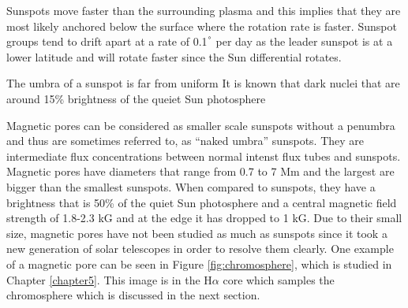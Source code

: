	Sunspots move faster than the surrounding plasma and this implies that they are most likely anchored below the surface where the rotation rate is faster.
	Sunspot groups tend to drift apart at a rate of 0.1$^\degree$ per day as the leader sunspot is at a lower latitude and will rotate faster since the Sun differential rotates.
	
	The umbra of a sunspot is far from uniform 
	It is known that dark nuclei that are around 15\% brightness of the queiet Sun photosphere
	
    Magnetic pores can be considered as smaller scale sunspots without a penumbra and thus are sometimes referred to, as ``naked umbra'' sunspots.
    They are intermediate flux concentrations between normal intenst flux tubes and sunspots.
	Magnetic pores have diameters that range from 0.7 to 7 Mm and the largest are bigger than the smallest sunspots.
	When compared to sunspots, they have a brightness that is 50\% of the quiet Sun photosphere and a central magnetic field strength of 1.8-2.3 kG and at the edge it has dropped to 1 kG.
    Due to their small size, magnetic pores have not been studied as much as sunspots since it took a new generation of solar telescopes in order to resolve them clearly.
    One example of a magnetic pore can be seen in Figure \ref{fig:chromosphere}, which is studied in Chapter \ref{chapter5}.
    This image is in the H$\alpha$ core which samples the chromosphere which is discussed in the next section.
		
